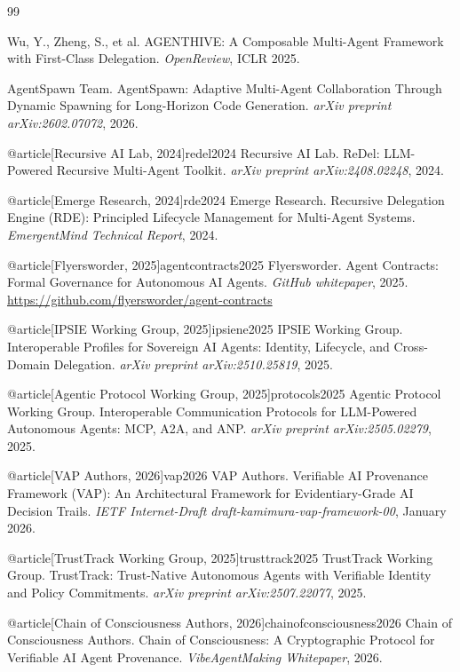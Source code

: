 \begin{thebibliography}{99}

Wu, Y., Zheng, S., et al. \newblock AGENTHIVE: A Composable Multi-Agent Framework with First-Class Delegation.
\newblock \emph{OpenReview}, ICLR 2025.

AgentSpawn Team. \newblock AgentSpawn: Adaptive Multi-Agent Collaboration Through Dynamic Spawning for Long-Horizon Code Generation.
\newblock \emph{arXiv preprint arXiv:2602.07072}, 2026.

@article[Recursive AI Lab, 2024]{redel2024}
Recursive AI Lab. \newblock ReDel: LLM-Powered Recursive Multi-Agent Toolkit.
\newblock \emph{arXiv preprint arXiv:2408.02248}, 2024.

@article[Emerge Research, 2024]{rde2024}
Emerge Research. \newblock Recursive Delegation Engine (RDE): Principled Lifecycle Management for Multi-Agent Systems.
\newblock \emph{EmergentMind Technical Report}, 2024.

@article[Flyersworder, 2025]{agentcontracts2025}
Flyersworder. \newblock Agent Contracts: Formal Governance for Autonomous AI Agents.
\newblock \emph{GitHub whitepaper}, 2025. \url{https://github.com/flyersworder/agent-contracts}

@article[IPSIE Working Group, 2025]{ipsiene2025}
IPSIE Working Group. \newblock Interoperable Profiles for Sovereign AI Agents: Identity, Lifecycle, and Cross-Domain Delegation.
\newblock \emph{arXiv preprint arXiv:2510.25819}, 2025.

@article[Agentic Protocol Working Group, 2025]{protocols2025}
Agentic Protocol Working Group. \newblock Interoperable Communication Protocols for LLM-Powered Autonomous Agents: MCP, A2A, and ANP.
\newblock \emph{arXiv preprint arXiv:2505.02279}, 2025.

@article[VAP Authors, 2026]{vap2026}
VAP Authors. \newblock Verifiable AI Provenance Framework (VAP): An Architectural Framework for Evidentiary-Grade AI Decision Trails.
\newblock \emph{IETF Internet-Draft draft-kamimura-vap-framework-00}, January 2026.

@article[TrustTrack Working Group, 2025]{trusttrack2025}
TrustTrack Working Group. \newblock TrustTrack: Trust-Native Autonomous Agents with Verifiable Identity and Policy Commitments.
\newblock \emph{arXiv preprint arXiv:2507.22077}, 2025.

@article[Chain of Consciousness Authors, 2026]{chainofconsciousness2026}
Chain of Consciousness Authors. \newblock Chain of Consciousness: A Cryptographic Protocol for Verifiable AI Agent Provenance.
\newblock \emph{VibeAgentMaking Whitepaper}, 2026.


\end{thebibliography}
